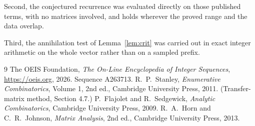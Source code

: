 \documentclass[11pt,a4paper]{article}
\theoremstyle{plain}
\theoremstyle{definition}
\begin{document}
Second, the conjectured recurrence was evaluated directly on those published terms, with no
matrices involved, and holds wherever the proved range and the data overlap.

Third, the annihilation test of Lemma~\ref{lem:crit} was carried out in exact integer
arithmetic on the whole vector rather than on a sampled prefix.

\begin{thebibliography}{9}
 The OEIS Foundation, \emph{The On-Line Encyclopedia of Integer
Sequences}, \url{https://oeis.org}, 2026. Sequence A263713.
 R.~P.~Stanley, \emph{Enumerative Combinatorics}, Volume 1, 2nd ed.,
Cambridge University Press, 2011. (Transfer-matrix method, Section 4.7.)
 P.~Flajolet and R.~Sedgewick, \emph{Analytic Combinatorics}, Cambridge
University Press, 2009.
 R.~A.~Horn and C.~R.~Johnson, \emph{Matrix Analysis}, 2nd ed., Cambridge
University Press, 2013.
\end{thebibliography}
\end{document}
